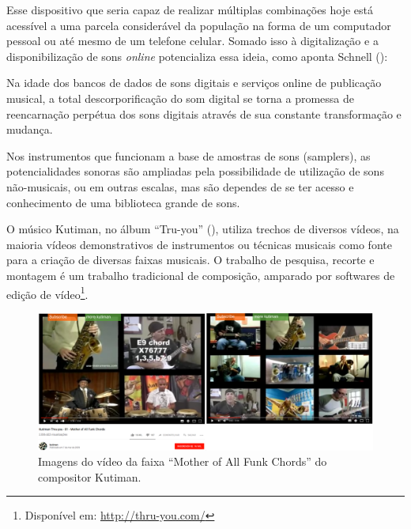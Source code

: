 Esse dispositivo que seria capaz de realizar múltiplas combinações hoje está acessível a uma parcela considerável da população na forma de um computador pessoal ou até mesmo de um telefone celular. Somado isso à digitalização e a disponibilização de sons \emph{online} potencializa essa ideia, como aponta Schnell (\citeyear{Schnell2013}):

\begin{citacao}
Na idade dos bancos de dados de sons digitais e serviços online de publicação musical, a total descorporificação do som digital se torna a promessa de reencarnação perpétua dos sons digitais através de sua constante transformação e mudança.\cite{Schnell2013}

\end{citacao}

Nos instrumentos que funcionam a base de amostras de sons (samplers), as potencialidades sonoras são ampliadas pela possibilidade de utilização de sons não-musicais, ou em outras escalas, mas são dependes de se ter acesso e conhecimento de uma biblioteca grande de sons. 

O músico Kutiman, no álbum ``Tru-you'' (\citeyear{Kutiman2010}), utiliza trechos de diversos vídeos, na maioria vídeos demonstrativos de instrumentos ou técnicas musicais como fonte para a criação de diversas faixas musicais. O trabalho de pesquisa, recorte e montagem é um trabalho tradicional de composição, amparado por softwares de edição de vídeo\footnote{Disponível em: \url{http://thru-you.com/}}. 


\begin{figure}
\includegraphics[width=1\textwidth]{pictures/cap4/kutiman}
\caption{Imagens do vídeo da faixa ``Mother of All Funk Chords'' do compositor Kutiman. }
\label{Kutiman}
\end{figure}


